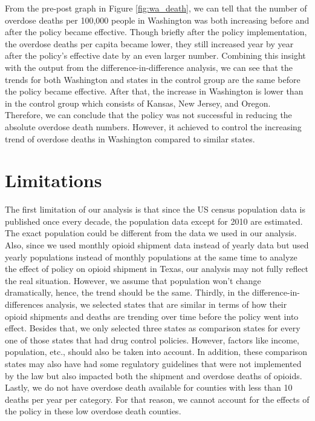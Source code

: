 \documentclass[12pt,letterpaper]{article}
\begin{document}
From the pre-post graph in Figure \ref{fig:wa_death}, we can tell that the number of overdose deaths per 100,000 people in Washington was both increasing before and after the policy became effective. Though briefly after the policy implementation, the overdose deaths per capita became lower, they still increased year by year after the policy's effective date by an even larger number. Combining this insight with the output from the difference-in-difference analysis, we can see that the trends for both Washington and states in the control group are the same before the policy became effective. After that, the increase in Washington is lower than in the control group which consists of Kansas, New Jersey, and Oregon. Therefore, we can conclude that the policy was not successful in reducing the absolute overdose death numbers. However, it achieved to control the increasing trend of overdose deaths in Washington compared to similar states.

\section{Limitations}

The first limitation of our analysis is that since the US census population data is published once every decade, the population data except for 2010 are estimated. The exact population could be different from the data we used in our analysis. Also, since we used monthly opioid shipment data instead of yearly data but used yearly populations instead of monthly populations at the same time to analyze the effect of policy on opioid shipment in Texas, our analysis may not fully reflect the real situation. However, we assume that population won’t change dramatically, hence, the trend should be the same. Thirdly, in the difference-in-differences analysis, we selected states that are similar in terms of how their opioid shipments and deaths are trending over time before the policy went into effect. Besides that, we only selected three states as comparison states for every one of those states that had drug control policies. However, factors like income, population, etc., should also be taken into account. In addition, these comparison states may also have had some regulatory guidelines that were not implemented by the law but also impacted both the shipment and overdose deaths of opioids.
Lastly, we do not have overdose death available for counties with less than 10 deaths per year per category. For that reason, we cannot account for the effects of the policy in these low overdose death counties.
\end{document}
